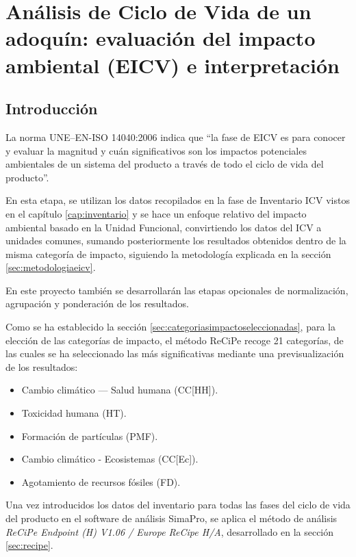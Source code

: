 \chapter{Análisis de Ciclo de Vida de un adoquín: evaluación del impacto ambiental (EICV) e interpretación}

\section{Introducción}
La norma UNE–EN-ISO 14040:2006 indica que ``la fase de EICV es para conocer y evaluar la magnitud y cuán significativos son los impactos potenciales ambientales de un sistema del producto a través de todo el ciclo de vida del producto''.

En esta etapa, se utilizan los datos recopilados en la fase de Inventario ICV vistos en el capítulo \ref{cap:inventario} y se hace un enfoque relativo del impacto ambiental basado en la Unidad Funcional, convirtiendo los datos del ICV a unidades comunes, sumando posteriormente los resultados obtenidos dentro de la misma categoría de impacto, siguiendo la metodología explicada en la sección \ref{sec:metodologiaeicv}.

En este proyecto también se desarrollarán las etapas opcionales de normalización, agrupación y ponderación de los resultados.

Como se ha establecido la sección \ref{sec:categoriasimpactoseleccionadas}, para la elección de las categorías de impacto, el método ReCiPe recoge 21 categorías, de las cuales se ha seleccionado las más significativas mediante una previsualización de los resultados:

\begin{itemize}
  \item Cambio climático — Salud humana (CC[HH]).
  \item Toxicidad humana (HT).
  \item Formación de partículas (PMF).
  \item Cambio climático - Ecosistemas (CC[Ec]).
  \item Agotamiento de recursos fósiles (FD).
\end{itemize}

Una vez introducidos los datos del inventario para todas las fases del ciclo de vida del producto en el software de análisis SimaPro, se aplica el método de análisis \textit{ReCiPe Endpoint (H) V1.06 / Europe ReCipe H/A}, desarrollado en la sección \ref{sec:recipe}.

